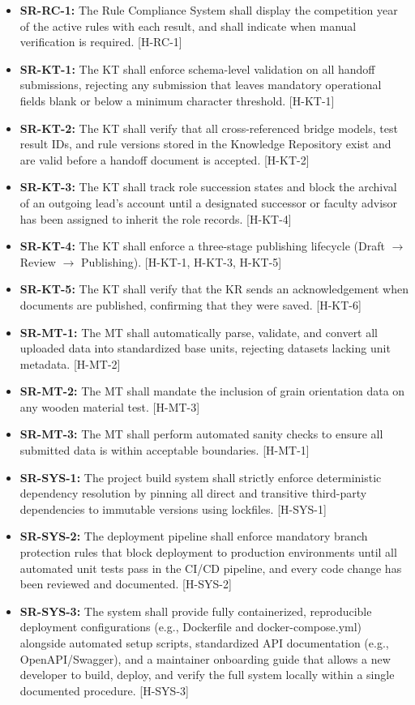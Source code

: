 \documentclass{article}
\begin{document}
\begin{itemize}
    error message whenever the calculation service fails, does not respond, or returns an inappropriate 
    value. [H-PA-1]
    \item \textbf{SR-RC-1:} The Rule Compliance System shall display the competition year 
    of the active rules with each result, and shall indicate when 
    manual verification is required. [H-RC-1]
    \item \textbf{SR-KT-1:} The KT shall enforce schema-level validation on all handoff submissions, rejecting any submission that leaves mandatory operational fields blank or below a minimum character threshold. [H-KT-1]
    \item \textbf{SR-KT-2:} The KT shall verify that all cross-referenced bridge models, test result IDs, and rule versions stored in the Knowledge Repository exist and are valid before a handoff document is accepted. [H-KT-2]
    \item \textbf{SR-KT-3:} The KT shall track role succession states and block the archival of an outgoing lead's account until a designated successor or faculty advisor has been assigned to inherit the role records. [H-KT-4]
    \item \textbf{SR-KT-4:} The KT shall enforce a three-stage publishing lifecycle (Draft \(\rightarrow\) Review \(\rightarrow\) Publishing). [H-KT-1, H-KT-3, H-KT-5]
    \item \textbf{SR-KT-5:} The KT shall verify that the KR sends an acknowledgement when documents are published, confirming that they were saved. [H-KT-6]
    \item \textbf{SR-MT-1:} The MT shall automatically parse, validate, and convert all uploaded data into standardized base units, rejecting datasets lacking unit metadata. [H-MT-2]
    \item \textbf{SR-MT-2:} The MT shall mandate the inclusion of grain orientation data on any wooden material test. [H-MT-3]
    \item \textbf{SR-MT-3:} The MT shall perform automated sanity checks to ensure all submitted data is within acceptable boundaries. [H-MT-1]
    \item \textbf{SR-SYS-1:} The project build system shall strictly enforce deterministic dependency resolution by pinning all direct and transitive third-party dependencies to immutable versions using lockfiles. [H-SYS-1]
    \item \textbf{SR-SYS-2:} The deployment pipeline shall enforce mandatory branch protection rules that block deployment to production environments until all automated unit tests pass in the CI/CD pipeline, and every code change has been reviewed and documented. [H-SYS-2]
    \item \textbf{SR-SYS-3:} The system shall provide fully containerized, reproducible deployment configurations (e.g., Dockerfile and docker-compose.yml) alongside automated setup scripts, standardized API documentation (e.g., OpenAPI/Swagger), and a maintainer onboarding guide that allows a new developer to build, deploy, and verify the full system locally within a single documented procedure. [H-SYS-3]
    
\end{itemize}
\end{document}
